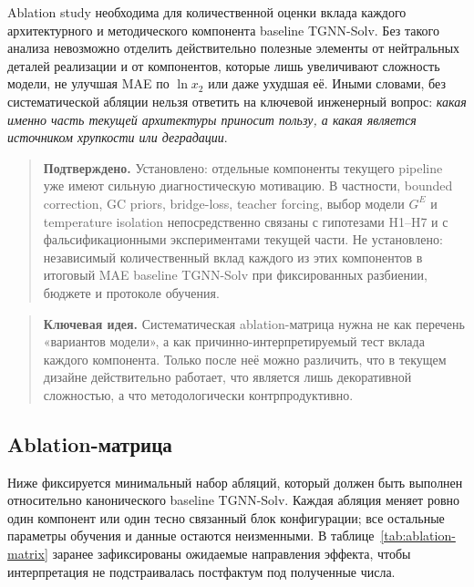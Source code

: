 \documentclass[11pt]{article}
\newcommand{\keyidea}[1]{\begin{quote}\textbf{Ключевая идея.} #1\end{quote}}
\newcommand{\validated}[1]{\begin{quote}\textbf{Подтверждено.} #1\end{quote}}
\begin{document}
Ablation study необходима для количественной оценки вклада каждого архитектурного и методического компонента baseline TGNN-Solv. Без такого анализа невозможно отделить действительно полезные элементы от нейтральных деталей реализации и от компонентов, которые лишь увеличивают сложность модели, не улучшая MAE по $\ln x_2$ или даже ухудшая её. Иными словами, без систематической абляции нельзя ответить на ключевой инженерный вопрос: \textit{какая именно часть текущей архитектуры приносит пользу, а какая является источником хрупкости или деградации}.

\validated{Установлено: отдельные компоненты текущего pipeline уже имеют сильную диагностическую мотивацию. В частности, bounded correction, GC priors, bridge-loss, teacher forcing, выбор модели $G^E$ и temperature isolation непосредственно связаны с гипотезами H1--H7 и с фальсификационными экспериментами текущей части. Не установлено: независимый количественный вклад каждого из этих компонентов в итоговый MAE baseline TGNN-Solv при фиксированных разбиении, бюджете и протоколе обучения.}

\keyidea{Систематическая ablation-матрица нужна не как перечень «вариантов модели», а как причинно-интерпретируемый тест вклада каждого компонента. Только после неё можно различить, что в текущем дизайне действительно работает, что является лишь декоративной сложностью, а что методологически контрпродуктивно.}

\subsection{Ablation-матрица}

Ниже фиксируется минимальный набор абляций, который должен быть выполнен относительно канонического baseline TGNN-Solv. Каждая абляция меняет ровно один компонент или один тесно связанный блок конфигурации; все остальные параметры обучения и данные остаются неизменными. В таблице~\ref{tab:ablation-matrix} заранее зафиксированы ожидаемые направления эффекта, чтобы интерпретация не подстраивалась постфактум под полученные числа.
\end{document}

